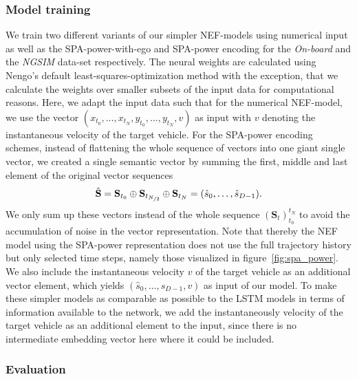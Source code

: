 \subsubsection{Model training}%
\label{ssubsec:model_training_nef}

We train two different variants of our simpler \ac{NEF}-models using numerical input as well as the \ac{SPA}-power-with-ego and \ac{SPA}-power encoding for the \emph{On-board} and the \emph{\ac{NGSIM}} data-set respectively.
The neural weights are calculated using \acs{Nengo}'s default least-squares-optimization method with the exception, that we calculate the weights over smaller subsets of the input data for computational reasons.
Here, we adapt the input data such that for the numerical \ac{NEF}-model, we use the vector $(x_{t_{0}}, \ldots, x_{t_{N}}, y_{t_{0}}, \ldots, y_{t_{N}}, v)$ as input with $v$ denoting the instantaneous velocity of the target vehicle.
For the \ac{SPA}-power encoding schemes, instead of flattening the whole sequence of vectors into one giant single vector, we created a single semantic vector by summing the first, middle and last element of the original vector sequences
\begin{equation}
  \hat{\mathbf{S}} =  \mathbf{S}_{t_0} \oplus \mathbf{S}_{t_{\nicefrac{N}{2}}} \oplus \mathbf{S}_{t_N} = (\hat{s}_0, \ldots, \hat{s}_{D-1}).
\end{equation}
We only sum up these vectors instead of the whole sequence $(\mathbf{S}_{t})_{t_0}^{t_N}$ to avoid the accumulation of noise in the vector representation.
Note that thereby the \ac{NEF} model using the \ac{SPA}-power representation does not use the full trajectory history but only selected time steps, namely those visualized in figure~\ref{fig:spa_power}.
We also include the instantaneous velocity $v$ of the target vehicle as an additional vector element, which yields $(\hat{s}_0, \ldots, \hat{s}_{D-1}, v)$ as input of our model.
To make these simpler models as comparable as possible to the \ac{LSTM} models in terms of information available to the network, we add the instantaneously velocity of the target vehicle as an additional element to the input, since there is no intermediate embedding vector here where it could be included.

\subsubsection{Evaluation}%
\label{ssubsec:evaluation_nef}

